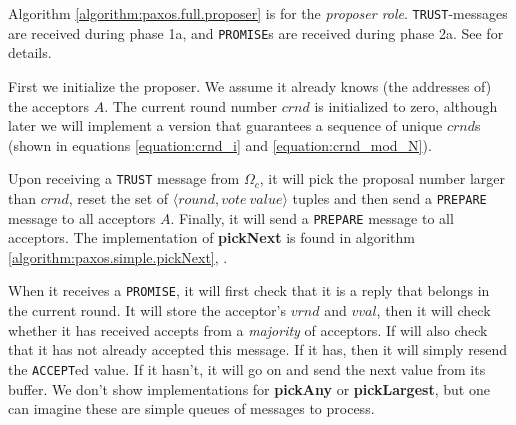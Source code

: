 Algorithm \ref{algorithm:paxos.full.proposer}
 is for the \textit{proposer
role}.  \texttt{TRUST}-messages are received during phase 1a, and
\texttt{PROMISE}s are received during phase 2a. See \cite{Lam01} for details.

First we initialize the proposer. We assume it already knows (the addresses
of) the acceptors $A$.  The current round number $crnd$ is initialized to
zero, although later we will implement a version that guarantees a sequence
of unique $crnd$s (shown in equations \ref{equation:crnd_i} and
\ref{equation:crnd_mod_N}).

Upon receiving a \texttt{TRUST} message from $\Omega_c$, it will pick the
proposal number larger than $crnd$, reset the set of
$\langle round, vote~value\rangle$ tuples and then send a
\texttt{PREPARE} message to all acceptors $A$.  Finally, it will
send a \texttt{PREPARE} message to all acceptors.
%
The implementation of \textbf{pickNext} is found in
algorithm \ref{algorithm:paxos.simple.pickNext},
.

When it receives a \texttt{PROMISE}, it will first check that it is a reply
that belongs in the current round.  It will store the acceptor's $vrnd$ and
$vval$, then it will check whether it has received accepts from a
\textit{majority} of acceptors.
If will also check that it has not already accepted this message.
If it has, then it will simply resend the \texttt{ACCEPT}ed value.
If it hasn't, it will go on and send the next value from its buffer.
We don't show implementations for \textbf{pickAny} or \textbf{pickLargest},
but one can imagine these are simple queues of messages to process.

